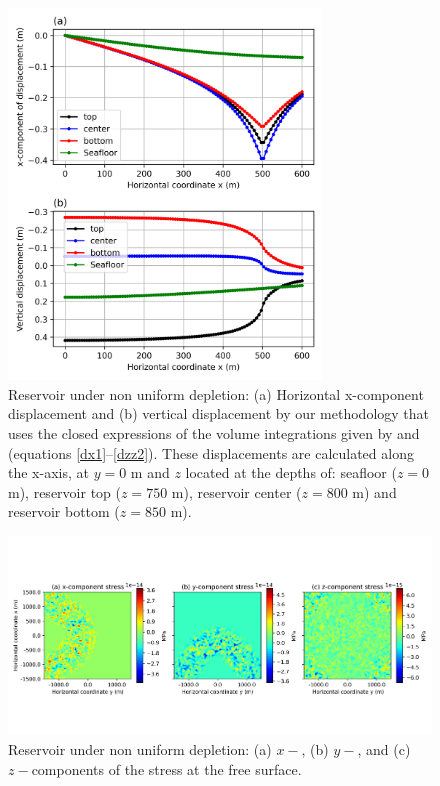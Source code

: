 \documentclass[journal abbreviation, manuscript]{copernicus}
\begin{document}
\begin{figure}[ht]
\includegraphics[width=8.3cm]{Fig/Figure_Displacement_z_levels_non_uniform_depletion.png}
\caption{Reservoir under non uniform depletion: (a) Horizontal x-component displacement and (b) vertical displacement by our methodology that uses the closed expressions of the volume integrations given by \cite{Nagyetal2000} and \cite{Nagyetal2002} (equations \ref{dx1}--\ref{dzz2}).
These displacements are calculated along the x-axis, at $y = 0$ m and $z$ located at the depths of:  seafloor ($z = 0$ m), reservoir top ($z = 750$ m), reservoir center ($z = 800$ m) and reservoir bottom ($z = 850$ m).}
\label{fig:displacement_z_levels_non_uniform_depletion}
\end{figure}


\begin{figure}[ht]
\includegraphics[width=12cm]{Fig/Figure_Null_stress_non_uniform_depletion.png}
\caption{Reservoir under non uniform depletion: (a) $x-$, (b) $y-$, and (c) $z-$components of the stress at the free surface.}
\label{fig:Null_stress_non_uniform_depletion}
\end{figure}
\end{document}
